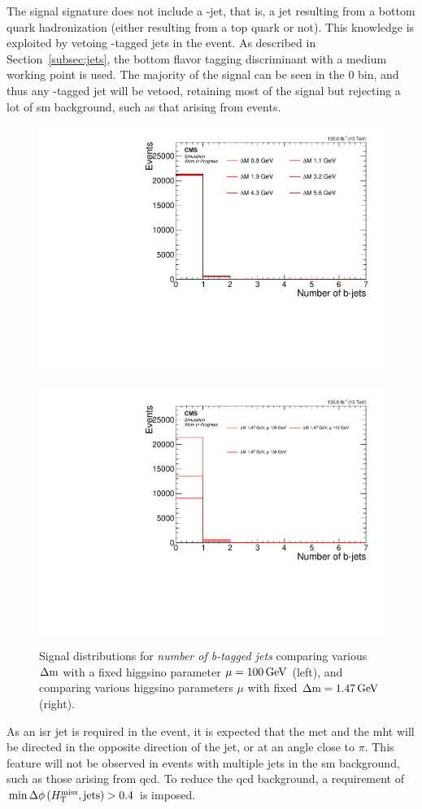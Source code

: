 The signal signature does not include a \PQb-jet, that is, a jet resulting from a bottom quark hadronization (either resulting from a top quark or not). This knowledge is exploited by vetoing \PQb-tagged jets in the event. As described in Section~\ref{subsec:jets}, the \DEEPCSV bottom flavor tagging discriminant with a medium working point is used. The majority of the signal can be seen in the 0 bin, and thus any \PQb-tagged jet will be vetoed, retaining most of the signal but rejecting a lot of \gls{sm} background, such as that arising from \ttbar events.

\begin{figure}[!htb]
\centering
\includegraphics[width=0.48\linewidth]{plots/signal_common_distributions_fixed_mu/none_BTagsDeepMedium.pdf} \,
\includegraphics[width=0.48\linewidth]{plots/signal_common_distributions_fixed_dm/none_BTagsDeepMedium.pdf}  \\
\caption[Signal \emph{number of b-tagged jets} distributions]{ Signal distributions for \emph{number of b-tagged jets} comparing various $\Delta\mathrm{m}$ with a fixed higgsino parameter $\mu=100\,\text{Ge\hspace{-.08em}V}$ (left), and comparing various higgsino parameters $\mu$ with fixed $\Delta\mathrm{m}=1.47\,\text{Ge\hspace{-.08em}V}$ (right).}
\label{fig:signal-bjets}
\end{figure}

As an \gls{isr} jet is required in the event, it is expected that the \gls{met} and the \gls{mht} will be directed in the opposite direction of the jet, or at an angle close to $\pi$. This feature will not be observed in events with multiple jets in the \gls{sm} background, such as those arising from \gls{qcd}. To reduce the \gls{qcd} background, a requirement of $\min{\Delta\phi\left(\ensuremath{H_{\mathrm{T}}^{\text{miss}}},\mathrm{jets}\right)} > 0.4$ is imposed.

